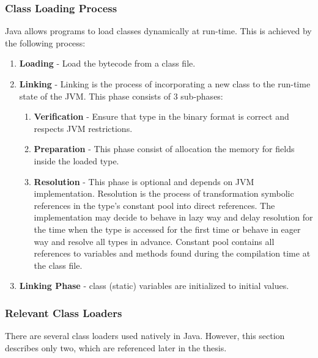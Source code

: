 \subsubsection{Class Loading Process}
Java allows programs to load classes dynamically at run-time. This is achieved by the following process:
\begin{enumerate}
	\item \textbf{Loading} - Load the bytecode from a class file.
	\item \textbf{Linking} - Linking is the process of incorporating a new class to the run-time state of the JVM. This phase consists of 3 sub-phases:
	\begin{enumerate}
		\item \textbf{Verification} - Ensure that type in the binary format is correct and respects JVM restrictions.
		\item \textbf{Preparation} - This phase consist of allocation the memory for fields inside the loaded type.
		\item \textbf{Resolution} - This phase is optional and depends on JVM implementation. Resolution is the process of transformation symbolic references in the type's constant pool into direct references. The implementation may decide to behave in lazy way and delay resolution for the time when the type is accessed for the first time or behave in eager way and resolve all types in advance. Constant pool contains all references to variables and methods found during the compilation time at the class file.
	\end{enumerate}
	\item \textbf{Linking Phase} - class (static) variables are initialized to initial values.
\end{enumerate}
\subsubsection{Relevant Class Loaders}
There are several class loaders used natively in Java. However, this section describes only two, which are referenced later in the thesis. 

